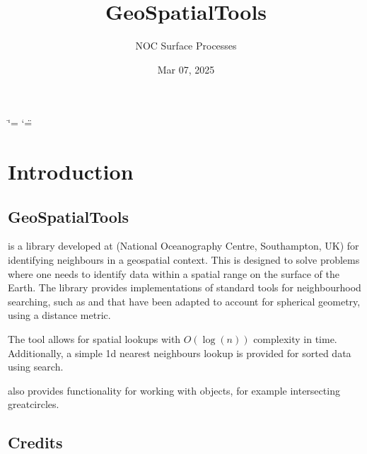 \documentclass[letterpaper,10pt,english]{sphinxmanual}
\title{GeoSpatialTools}
\date{Mar 07, 2025}
\author{NOC Surface Processes}
\begin{document}
\ifdefined\shorthandoff
  \ifnum\catcode`\=\string=\active\shorthandoff{=}\fi
  \ifnum\catcode`\"=\active{}\fi
\fi

\pagestyle{empty}
\sphinxmaketitle
\pagestyle{plain}
\sphinxtableofcontents
\pagestyle{normal}
\label{\detokenize{index::doc}}


\sphinxstepscope


\chapter{Introduction}
\label{\detokenize{introduction:introduction}}\label{\detokenize{introduction::doc}}

\section{GeoSpatialTools}
\label{\detokenize{introduction:geospatialtools}}
\sphinxAtStartPar
{} is a  library developed at  (National Oceanography Centre, Southampton, UK) for
identifying neighbours in a geo\sphinxhyphen{}spatial context. This is designed to solve problems where one needs to identify
data within a spatial range on the surface of the Earth. The library provides implementations of standard tools
for neighbourhood searching, such as  and  that have been adapted to account for spherical
geometry, using a  distance metric.

\sphinxAtStartPar
The tool allows for spatial look\sphinxhyphen{}ups with \(O(\log(n))\) complexity in time. Additionally, a simple 1\sphinxhyphen{}d nearest
neighbours look\sphinxhyphen{}up is provided for sorted data using  search.

\sphinxAtStartPar
{} also provides functionality for working with  objects, for example intersecting
great\sphinxhyphen{}circles.


\section{Credits}
\label{\detokenize{introduction:credits}}
\end{document}
